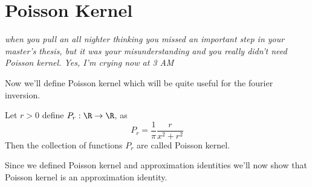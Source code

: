 \section{Poisson Kernel}
\textit{when you pull an all nighter thinking you missed an important step in your master's thesis, but it was your misunderstanding and you really didn't need Poisson kernel. Yes, I'm crying now at 3 AM}
  
  Now we'll define Poisson kernel which will be quite useful for the fourier inversion.
\begin{definition}
  \label{def:poisson_kernel}
  Let $r>0$ define $P_r : \R \to \R$, as $$P_r = \frac{1}{\pi}\frac{r}{x^2 + r^2}$$
  Then the collection of functions $P_r$ are called Poisson kernel.
\end{definition}

Since we defined Poisson kernel and approximation identities we'll now show that Poisson kernel is an approximation identity.

